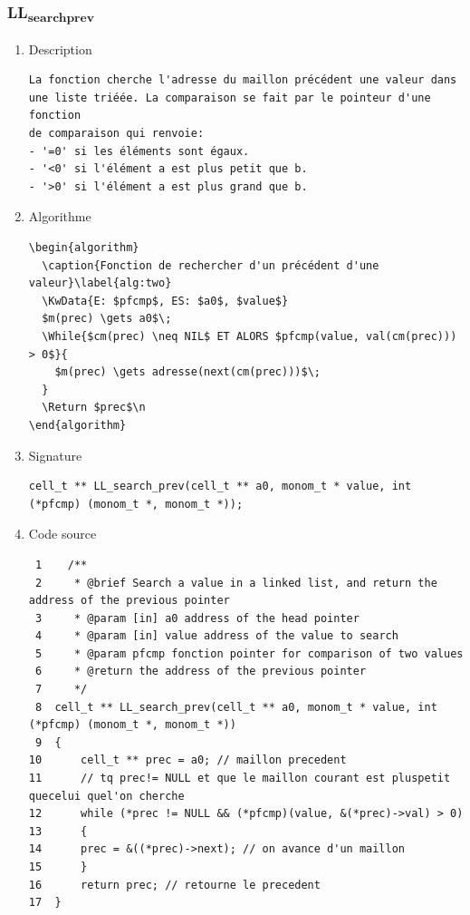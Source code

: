 \documentclass[11pt]{article}
\begin{document}
\subsubsection{LL\textsubscript{search}\textsubscript{prev}}
\label{sec:org15ce33e}
\begin{enumerate}
\item Description
\label{sec:org8245428}

\begin{verbatim}
La fonction cherche l'adresse du maillon précédent une valeur dans
une liste triéée. La comparaison se fait par le pointeur d'une fonction
de comparaison qui renvoie:
- '=0' si les éléments sont égaux.
- '<0' si l'élément a est plus petit que b.
- '>0' si l'élément a est plus grand que b.
\end{verbatim}

\item Algorithme
\label{sec:org8bf25bd}

\begin{verbatim}
\begin{algorithm}
  \caption{Fonction de rechercher d'un précédent d'une valeur}\label{alg:two}
  \KwData{E: $pfcmp$, ES: $a0$, $value$}
  $m(prec) \gets a0$\;
  \While{$cm(prec) \neq NIL$ ET ALORS $pfcmp(value, val(cm(prec))) > 0$}{
    $m(prec) \gets adresse(next(cm(prec)))$\;
  }
  \Return $prec$\n
\end{algorithm}
\end{verbatim}

\item Signature
\label{sec:org46547e4}

\begin{verbatim}
cell_t ** LL_search_prev(cell_t ** a0, monom_t * value, int (*pfcmp) (monom_t *, monom_t *));
\end{verbatim}

\item Code source
\label{sec:org8aab18b}

\begin{verbatim}
 1    /**
 2     * @brief Search a value in a linked list, and return the address of the previous pointer
 3     * @param [in] a0 address of the head pointer
 4     * @param [in] value address of the value to search
 5     * @param pfcmp fonction pointer for comparison of two values
 6     * @return the address of the previous pointer
 7     */
 8  cell_t ** LL_search_prev(cell_t ** a0, monom_t * value, int (*pfcmp) (monom_t *, monom_t *))
 9  {
10      cell_t ** prec = a0; // maillon precedent
11      // tq prec!= NULL et que le maillon courant est pluspetit quecelui quel'on cherche
12      while (*prec != NULL && (*pfcmp)(value, &(*prec)->val) > 0)
13      {
14  	prec = &((*prec)->next); // on avance d'un maillon
15      }
16      return prec; // retourne le precedent
17  }
\end{verbatim}


\end{enumerate}
\end{document}
